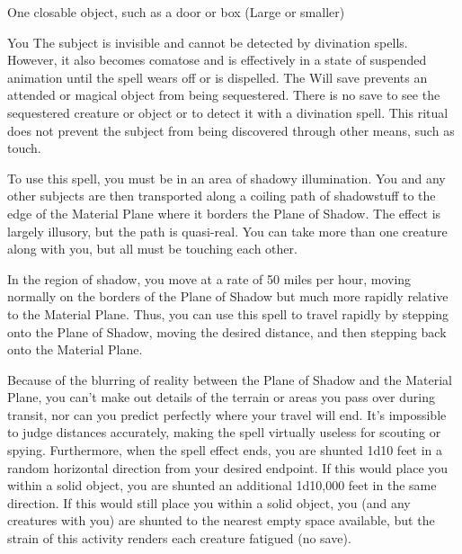 \begin{spelltarget}{One closable object, such as a door or box (Large or smaller)}
\begin{spelltarget}{You}
\spelleffect The subject is invisible and cannot be detected by divination spells. However, it also becomes comatose and is effectively in a state of suspended animation until the spell wears off or is dispelled.
\spellnotes The Will save prevents an attended or magical object from being sequestered. There is no save to see the sequestered creature or object or to detect it with a divination spell. This ritual does not prevent the subject from being discovered through other means, such as touch.

\spelldur{\durext \dismissable}
\spelleffect To use this spell, you must be in an area of shadowy illumination. You and any other subjects are then transported along a coiling path of shadowstuff to the edge of the Material Plane where it borders the Plane of Shadow. The effect is largely illusory, but the path is quasi-real. You can take more than one creature along with you, but all must be touching each other.
\par In the region of shadow, you move at a rate of 50 miles per hour, moving normally on the borders of the Plane of Shadow but much more rapidly relative to the Material Plane. Thus, you can use this spell to travel rapidly by stepping onto the Plane of Shadow, moving the desired distance, and then stepping back onto the Material Plane.
\par Because of the blurring of reality between the Plane of Shadow and the Material Plane, you can't make out details of the terrain or areas you pass over during transit, nor can you predict perfectly where your travel will end. It's impossible to judge distances accurately, making the spell virtually useless for scouting or spying. Furthermore, when the spell effect ends, you are shunted 1d10 feet in a random horizontal direction from your desired endpoint. If this would place you within a solid object, you are shunted an additional 1d10,000 feet in the same direction. If this would still place you within a solid object, you (and any creatures with you) are shunted to the nearest empty space available, but the strain of this activity renders each creature fatigued (no save).


\end{spelltarget}
\end{spelltarget}
